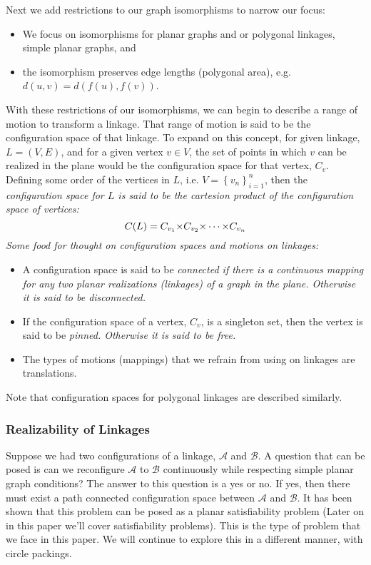 Next we add restrictions to our graph isomorphisms to narrow our focus:
\begin{itemize}
\item[\rn{1}] We focus on isomorphisms for planar graphs and or polygonal linkages, simple planar graphs, and
\item[\rn{2}] the isomorphism preserves edge lengths (polygonal area), e.g. $d(u,v) = d(f(u),f(v))$.
\end{itemize}  
With these restrictions of our isomorphisms, we can begin to describe a range of motion to transform a linkage.  That range of motion is said to be the configuration space of that linkage.  To expand on this concept, for given linkage, $L=(V,E)$, and for a given vertex $v \in V$, the set of points in which $v$ can be realized in the plane would be the configuration space for that vertex, $C_v$.  Defining some order of the vertices in $L$, i.e. $V = \left\lbrace v_n \right\rbrace_{i=1}^n$, then the \it{configuration space} for $L$ is said to be the cartesion product of the configuration space of vertices:
\begin{equation}\label{eqn:linkages-1}
C(L) = C_{v_1} {\times} C_{v_2} {\times} \cdots {\times} C_{v_n}
\end{equation} 
Some food for thought on configuration spaces and motions on linkages:
\begin{itemize}
\item[\rn{1}] A configuration space is said to be \it{connected} if there is a continuous mapping for any two planar realizations (linkages) of a graph in the plane.  Otherwise it is said to be \it{disconnected}.
\item[\rn{2}] If the configuration space of a vertex, $C_v$, is a singleton set, then the vertex is said to be \it{pinned}. Otherwise it is said to be \it{free}.
\item[\rn{3}] The types of motions (mappings) that we refrain from using on linkages are translations.
\end{itemize}
Note that configuration spaces for polygonal linkages are described similarly.
\subsubsection{Realizability of Linkages}
Suppose we had two configurations of a linkage, $\mathcal{A}$ and $\mathcal{B}$.  A question that can be posed is can we reconfigure $\mathcal{A}$ to $\mathcal{B}$ continuously while respecting simple planar graph conditions?  The answer to this question is a yes or no.  If yes, then there must exist a path connected configuration space between $\mathcal{A}$ and $\mathcal{B}$.  It has been shown that this problem can be posed as a planar satisfiability problem \cite{Breu19983,mulzer2008minimum} (Later on in this paper we'll cover satisfiability problems).  This is the type of problem that we face in this paper.  We will continue to explore this in a different manner, with circle packings.
\newpage 